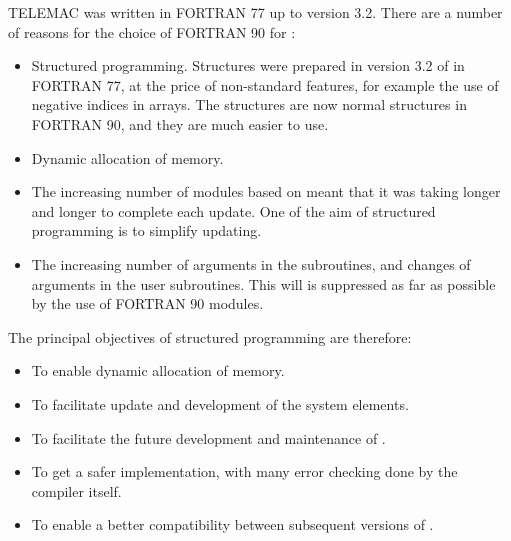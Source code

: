 TELEMAC was written in FORTRAN 77 up to version 3.2. There are a number of
reasons for the choice of FORTRAN 90 for \bief:
\begin{itemize}
\item Structured programming. Structures were prepared in version 3.2 of \bief
  in FORTRAN 77, at the price of non-standard features, for example the use of
  negative indices in arrays. The structures are now normal structures in
  FORTRAN 90, and they are much easier to use.
\item Dynamic allocation of memory.
\item The increasing number of modules based on \bief meant that it was taking
  longer and longer to complete each update. One of the aim of structured
  programming is to simplify updating.
\item The increasing number of arguments in the subroutines, and changes of
  arguments in the user subroutines. This will is suppressed as far as possible
  by the use of FORTRAN 90 modules.
\end{itemize}
The principal objectives of structured programming are therefore:
\begin{itemize}
\item To enable dynamic allocation of memory.
\item To facilitate update and development of the system elements.
\item To facilitate the future development and maintenance of \bief.
\item To get a safer implementation, with many error checking done by the
  compiler itself.
\item To enable a better compatibility between subsequent versions of \bief.
\end{itemize}
%
%




